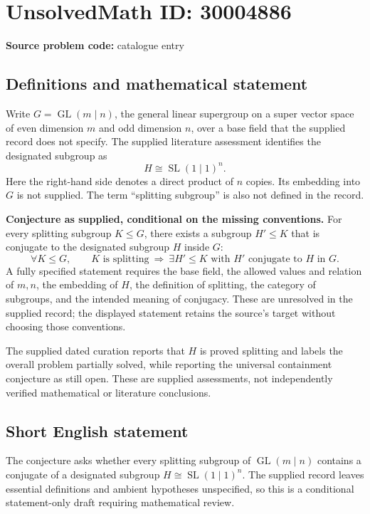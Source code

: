 \documentclass[11pt]{article}
\begin{document}
\section*{UnsolvedMath ID: 30004886}
\textbf{Source problem code:} catalogue entry
\subsection{Definitions and mathematical statement}
Write \(G=\operatorname{GL}(m\mid n)\), the general linear supergroup on a super vector space of even dimension \(m\) and odd dimension \(n\), over a base field that the supplied record does not specify. The supplied literature assessment identifies the designated subgroup as
\[
H\cong\operatorname{SL}(1\mid1)^{n}.
\]
Here the right-hand side denotes a direct product of \(n\) copies. Its embedding into \(G\) is not supplied. The term ``splitting subgroup'' is also not defined in the record.

\textbf{Conjecture as supplied, conditional on the missing conventions.} For every splitting subgroup \(K\leq G\), there exists a subgroup \(H'\leq K\) that is conjugate to the designated subgroup \(H\) inside \(G\):
\[
\forall K\leq G,\qquad
K\text{ is splitting}
\ \Longrightarrow\
\exists H'\leq K\text{ with }H'\text{ conjugate to }H\text{ in }G.
\]
A fully specified statement requires the base field, the allowed values and relation of \(m,n\), the embedding of \(H\), the definition of splitting, the category of subgroups, and the intended meaning of conjugacy. These are unresolved in the supplied record; the displayed statement retains the source's target without choosing those conventions.

The supplied dated curation reports that \(H\) is proved splitting and labels the overall problem partially solved, while reporting the universal containment conjecture as still open. These are supplied assessments, not independently verified mathematical or literature conclusions.
\subsection{Short English statement}
The conjecture asks whether every splitting subgroup of \(\operatorname{GL}(m\mid n)\) contains a conjugate of a designated subgroup \(H\cong\operatorname{SL}(1\mid1)^n\). The supplied record leaves essential definitions and ambient hypotheses unspecified, so this is a conditional statement-only draft requiring mathematical review.
\end{document}
